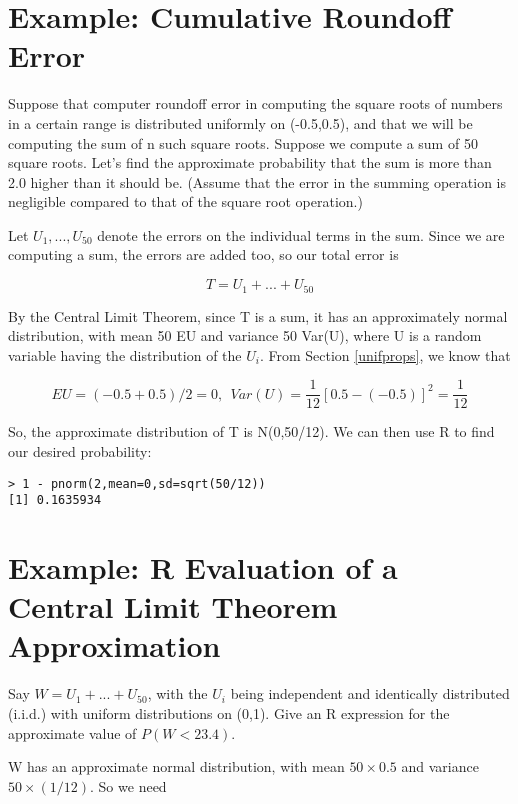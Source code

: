 \section{Example:  Cumulative Roundoff Error}

Suppose that computer roundoff error in computing the square roots of
numbers in a certain range is distributed uniformly on (-0.5,0.5), and
that we will be computing the sum of n such square roots.  Suppose we
compute a sum of 50 square roots.  Let's find the approximate
probability that the sum is more than 2.0 higher than it should be.
(Assume that the error in the summing operation is negligible compared
to that of the square root operation.)

Let $U_1,...,U_{50}$ denote the errors on the individual terms in the
sum.  Since we are computing a sum, the errors are added too, so our
total error is

\begin{equation}
T = U_1 + ... + U_{50}
\end{equation}

By the Central Limit Theorem, since T is a sum, it has an approximately
normal distribution, with mean 50 EU and variance 50 Var(U), where U is
a random variable having the distribution of the $U_i$.  From Section
\ref{unifprops}, we know that 

\begin{equation}
EU = (-0.5+0.5) / 2 = 0, ~~ Var(U) = \frac{1}{12} [0.5-(-0.5)]^2 =
\frac{1}{12}
\end{equation}

So, the approximate distribution of T is N(0,50/12).  We can then use R to
find our desired probability:

\begin{lstlisting}
> 1 - pnorm(2,mean=0,sd=sqrt(50/12))
[1] 0.1635934
\end{lstlisting}

\section{Example:  R Evaluation of a Central Limit Theorem
Approximation}

Say $W = U_1 + ... + U_{50}$, with the $U_i$ being independent and
identically distributed (i.i.d.) with uniform distributions on (0,1).
Give an R expression for the approximate value of $P(W < 23.4)$.

W has an approximate normal distribution, with mean $50 \times
0.5$ and variance $50 \times (1/12)$.  So we need


